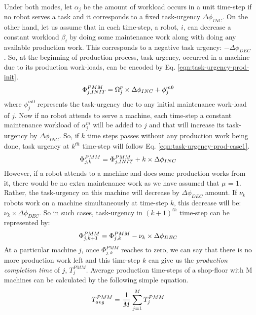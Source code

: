 \documentclass{intech}
\begin{document}
Under both modes, let $\alpha_{j}$ be the amount of workload occurs in a unit time-step if no robot serves a task and it corresponds to a fixed task-urgency $\Delta \phi_{INC}$. On the other hand, let us assume that in each time-step, a robot, $i$, can decrease a constant workload $\beta_{i}$ by doing some maintenance work along with doing any available production work. This  corresponds to a negative task urgency: $- \Delta \phi_{DEC}$. So, at the beginning of production process, task-urgency, occurred in a machine due to its production work-loads, can be encoded by Eq. \ref{eqn:task-urgency-prod-init}.
\begin{equation}
\small
\Phi_{j, INIT}^{PMM} = \Omega_{j}^{p} \times \Delta \phi_{INC} + \phi_{j}^{m0}
\label{eqn:task-urgency-prod-init}
\end{equation}
where $\phi_{j}^{m0}$ represents the task-urgency due to any initial maintenance work-load of $j$.
Now if no robot attends to serve a machine, each time-step a constant maintenance workload of $\alpha_{j}^{m}$ will be added to $j$ and that will increase its task-urgency by $\Delta \phi_{INC}$. So, if $k$ time steps passes without any production work being done, task urgency at $k^{th}$ time-step will follow Eq. \ref{eqn:task-urgency-prod-case1}.
\begin{equation}
\small
\Phi_{j, k}^{PMM} =\Phi_{j, INIT}^{PMM} + k \times \Delta \phi_{INC}
\label{eqn:task-urgency-prod-case1}
\end{equation}
However, if a robot attends to a machine and does some production works from it, there would be no extra maintenance work as we have assumed that $\mu$ = 1. Rather, the task-urgency on this machine will decrease by $\Delta \phi_{DEC}$ amount. If $\nu_{k}$ robots work on a machine simultaneously at time-step $k$, this decrease will be: $\nu_{k} \times \Delta \phi_{DEC}$. So in such cases, task-urgency in $(k+1)^{th}$ time-step can be represented by:
\begin{equation}
\small
\Phi_{j, k+1}^{PMM} = \Phi_{j, k}^{PMM} - \nu_{k} \times \Delta \phi_{DEC}
\label{eqn:task-urgency-prod-case2}
\end{equation}
At a particular machine $j$, once $\Phi_{j, k}^{PMM}$ reaches to zero, we can say that there is no more production work left and this time-step $k$ can give us the {\em production completion time} of $j$, $T_{j}^{PMM}$. Average production time-steps of a shop-floor with M machines can be calculated by the following simple equation.
\begin{equation}
\small
T_{avg}^{PMM} = \frac{1}{M} \sum_{j=1}^{M} T_{j}^{PMM} 
\label{eqn:avg-pmm}
\end{equation}
\end{document}
